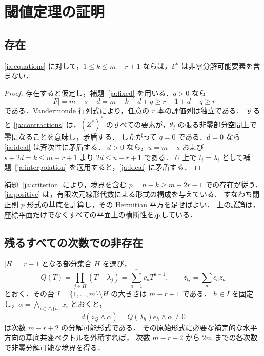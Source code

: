 \documentclass[12pt]{amsart}
\theoremstyle{definition}
\theoremstyle{remark}
\numberwithin{equation}{section}
\newcommand{\Eex}{\mathcal E}
\begin{document}
\section{閾値定理の証明}
\subsection{存在}
\begin{jprop}\label{ja:noexact}
\eqref{ja:equations} に対して，$1\leq k\leq m-r+1$ ならば，$\Eex^k$ は非零分解可能要素を含まない．
\end{jprop}
\begin{proof}
存在すると仮定し，補題~\ref{ja:fixed} を用いる．$q>0$ なら
\[
 |F|=m-s-d=m-k+d+q\geq r-1+d+q\geq r
\]
である．Vandermonde 行列式により，任意の $r$ 本の評価列は独立である．
すると \eqref{ja:contractions} は，$(Z^*)^*$ のすべての要素が，$\theta_j$ の張る非零部分空間上で零になることを意味し，矛盾する．
したがって $q=0$ である．$d=0$ なら \eqref{ja:ideal} は斉次性に矛盾する．
$d>0$ なら，$u=m-s$ および $s+2d=k\leq m-r+1$ より $2d\leq u-r+1$ である．
$U$ 上で $t_i=\lambda_i$ として補題~\ref{ja:interpolation} を適用すると，\eqref{ja:ideal} に矛盾する．
\end{proof}

補題~\ref{ja:criterion} により，境界を含む $p=n-k\geq m+2r-1$ での存在が従う．
\eqref{ja:positive} は，有限次元線形代数による形式の構成を与えている．
すなわち閉正則 $p$ 形式の基底を計算し，その Hermitian 平方を足せばよい．
上の議論は，座標平面だけでなくすべての平面上の横断性を示している．

\subsection{残るすべての次数での非存在}
$|H|=r-1$ となる部分集合 $H$ を選び，
\[
 Q(T)=\prod_{j\in H}(T-\lambda_j)
     =\sum_{a=1}^r c_a T^{a-1},\qquad z_Q=\sum_a c_a z_a
\]
とおく．その台 $I=\{1,\ldots,m\}\setminus H$ の大きさは $m-r+1$ である．
$h\in I$ を固定し，$\alpha=\bigwedge_{i\in I\setminus\{h\}}x_i$ とおくと，
\begin{equation}\label{ja:firstboundary}
 d(z_Q\wedge\alpha)=Q(\lambda_h)e_h\wedge\alpha\ne0
\end{equation}
は次数 $m-r+2$ の分解可能形式である．
その原始形式に必要な補完的な水平方向の基底共変ベクトルを外積すれば，
次数 $m-r+2$ から $2m$ までの各次数で非零分解可能な境界を得る．
\end{document}
